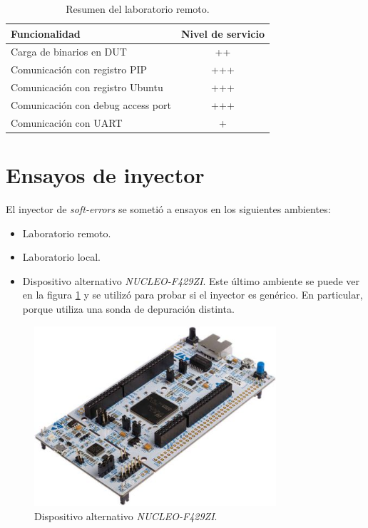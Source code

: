 \begin{table}[h]
	\centering
	\caption[Resumen del laboratorio remoto]{Resumen del laboratorio remoto.}

	\begin{tabular}{l c}    
		\toprule
        \textbf{Funcionalidad}             & \textbf{Nivel de servicio} \\
		\midrule
		Carga de binarios en DUT           & ++  \\		
		Comunicación con registro PIP      & +++ \\
		Comunicación con registro Ubuntu   & +++ \\
		Comunicación con debug access port & +++ \\
		Comunicación con UART              & +   \\
		\bottomrule
		\hline
	\end{tabular}
	\label{tab:funcionalidades}
\end{table}

\section{Ensayos de inyector}
\label{sec:testinyector}

El inyector de \emph{soft-errors} se sometió a ensayos en los siguientes ambientes:

\begin{itemize}
    \item Laboratorio remoto.
    \item Laboratorio local.
    \item Dispositivo alternativo \emph{NUCLEO-F429ZI}.
        Este último ambiente se puede ver en la figura \ref{fig:alternativo} y se utilizó para probar si el inyector es genérico.
        En particular, porque utiliza una sonda de depuración distinta.
\end{itemize}

\begin{figure}[htbp]
	\centering
	\includegraphics[width=0.8\textwidth]{./Figures/alternativo.jpg}
    \caption{Dispositivo alternativo \emph{NUCLEO-F429ZI}.}
	\label{fig:alternativo}
\end{figure}

